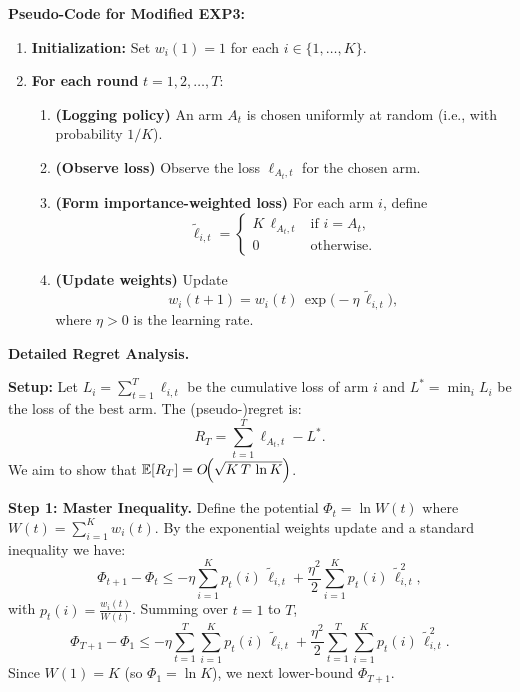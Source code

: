 \medskip
\noindent
\textbf{Pseudo-Code for Modified EXP3:}
\begin{enumerate}
    \item \textbf{Initialization:} Set \(w_i(1)=1\) for each \(i\in\{1,\dots,K\}\).
    \item \textbf{For each round} \(t=1,2,\dots,T\):
    \begin{enumerate}
       \item \textbf{(Logging policy)} An arm \(A_t\) is chosen uniformly at random (i.e., with probability \(1/K\)).
       \item \textbf{(Observe loss)} Observe the loss \(\ell_{A_t,t}\) for the chosen arm.
       \item \textbf{(Form importance-weighted loss)} For each arm \(i\), define
       \[
         \tilde{\ell}_{i,t}=
         \begin{cases}
           K\,\ell_{A_t,t} & \text{if } i=A_t,\\[1mm]
           0 & \text{otherwise.}
         \end{cases}
       \]
       \item \textbf{(Update weights)} Update
       \[
         w_i(t+1)=w_i(t)\,\exp\bigl(-\eta\,\tilde{\ell}_{i,t}\bigr),
       \]
       where \(\eta>0\) is the learning rate.
    \end{enumerate}
\end{enumerate}

\medskip
\noindent
\textbf{Detailed Regret Analysis.}

\medskip
\noindent
\textbf{Setup:}  
Let \(L_i=\sum_{t=1}^T \ell_{i,t}\) be the cumulative loss of arm \(i\) and \(L^*=\min_i L_i\) be the loss of the best arm.  
The (pseudo-)regret is:
\[
   R_T=\sum_{t=1}^T \ell_{A_t,t} - L^*.
\]
We aim to show that \(\mathbb{E}[R_T]=O\!\Bigl(\sqrt{K\,T\,\ln K}\Bigr)\).

\medskip
\noindent
\textbf{Step 1: Master Inequality.}  
Define the potential \(\Phi_t=\ln W(t)\) where \(W(t)=\sum_{i=1}^K w_i(t)\).  
By the exponential weights update and a standard inequality we have:
\[
   \Phi_{t+1}-\Phi_t\le -\eta\sum_{i=1}^K p_t(i)\,\tilde{\ell}_{i,t} + \frac{\eta^2}{2}\sum_{i=1}^K p_t(i)\,\tilde{\ell}_{i,t}^2,
\]
with \(p_t(i)=\frac{w_i(t)}{W(t)}\). Summing over \(t=1\) to \(T\),
\[
   \Phi_{T+1}-\Phi_1\le -\eta\sum_{t=1}^T\sum_{i=1}^K p_t(i)\,\tilde{\ell}_{i,t} + \frac{\eta^2}{2}\sum_{t=1}^T\sum_{i=1}^K p_t(i)\,\tilde{\ell}_{i,t}^2.
\]
Since \(W(1)=K\) (so \(\Phi_1=\ln K\)), we next lower-bound \(\Phi_{T+1}\).

